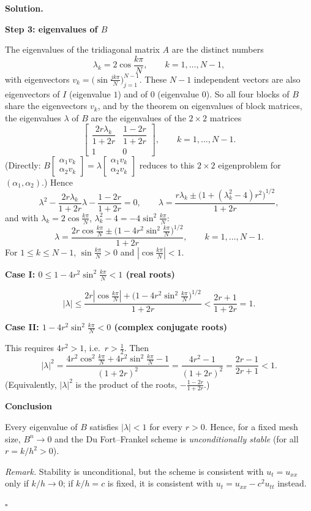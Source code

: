 \documentclass[11pt,a4paper]{article}
\newenvironment{solution}
  {\par\noindent\textbf{Solution.}\par\nobreak}
  {\par\hfill\(\square\)\par}
\newcommand{\step}[1]{\par\addvspace{0.5em}\noindent\textbf{#1}\par\nobreak}
\begin{document}
\begin{solution}
\step{Step 3: eigenvalues of \(B\)}
The eigenvalues of the tridiagonal matrix \(A\) are the distinct numbers
\[
  \lambda_k=2\cos\frac{k\pi}N,\qquad k=1,\dots,N-1,
\]
with eigenvectors \(v_k=\bigl(\sin\frac{jk\pi}N\bigr)_{j=1}^{N-1}\).
These \(N-1\) independent vectors are also eigenvectors of \(I\)
(eigenvalue \(1\)) and of \(0\) (eigenvalue \(0\)).  So all four blocks
of \(B\) share the eigenvectors \(v_k\), and by the theorem on
eigenvalues of block matrices, the eigenvalues \(\lambda\) of \(B\) are
the eigenvalues of the \(2\times2\) matrices
\[
  \begin{bmatrix}
    \dfrac{2r\lambda_k}{1+2r}&\dfrac{1-2r}{1+2r}\\[8pt]
    1&0
  \end{bmatrix},\qquad k=1,\dots,N-1 .
\]
(Directly: \(B\begin{bmatrix}\alpha_1v_k\\ \alpha_2v_k\end{bmatrix}
=\lambda\begin{bmatrix}\alpha_1v_k\\ \alpha_2v_k\end{bmatrix}\) reduces
to this \(2\times2\) eigenproblem for \((\alpha_1,\alpha_2)\).)  Hence
\[
  \lambda^2-\frac{2r\lambda_k}{1+2r}\lambda-\frac{1-2r}{1+2r}=0,
  \qquad
  \lambda=\frac{r\lambda_k\pm\bigl(1+(\lambda_k^2-4)r^2\bigr)^{1/2}}{1+2r},
\]
and with \(\lambda_k=2\cos\frac{k\pi}N\), \(\lambda_k^2-4=-4\sin^2\frac{k\pi}N\):
\[
  \lambda=\frac{2r\cos\frac{k\pi}N\pm\bigl(1-4r^2\sin^2\frac{k\pi}N\bigr)^{1/2}}{1+2r},
  \qquad k=1,\dots,N-1 .
\]
For \(1\le k\le N-1\), \(\sin\frac{k\pi}N>0\) and
\(|\cos\frac{k\pi}N|<1\).

\step{Case I: \(0\le1-4r^2\sin^2\frac{k\pi}N<1\) (real roots)}
\[
  |\lambda|\le\frac{2r|\cos\frac{k\pi}N|+\bigl(1-4r^2\sin^2\frac{k\pi}N\bigr)^{1/2}}{1+2r}
  <\frac{2r+1}{1+2r}=1 .
\]

\step{Case II: \(1-4r^2\sin^2\frac{k\pi}N<0\) (complex conjugate roots)}
This requires \(4r^2>1\), i.e.\ \(r>\frac12\).  Then
\[
  |\lambda|^2
  =\frac{4r^2\cos^2\frac{k\pi}N+4r^2\sin^2\frac{k\pi}N-1}{(1+2r)^2}
  =\frac{4r^2-1}{(1+2r)^2}=\frac{2r-1}{2r+1}<1 .
\]
(Equivalently, \(|\lambda|^2\) is the product of the roots,
\(-\frac{1-2r}{1+2r}\).)

\step{Conclusion}
Every eigenvalue of \(B\) satisfies \(|\lambda|<1\) for every \(r>0\).
Hence, for a fixed mesh size, \(B^n\to0\) and the Du Fort--Frankel
scheme is \emph{unconditionally stable} (for all \(r=k/h^2>0\)).

\textit{Remark.}  Stability is unconditional, but the scheme is
consistent with \(u_t=u_{xx}\) only if \(k/h\to0\); if \(k/h=c\) is
fixed, it is consistent with \(u_t=u_{xx}-c^2u_{tt}\) instead.
\end{solution}
\end{document}
